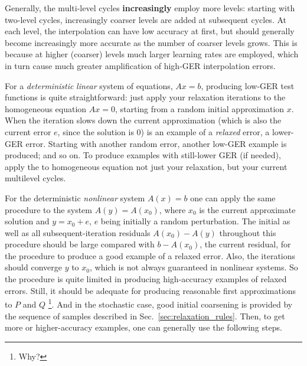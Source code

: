\documentclass{article} %
\begin{document}
Generally, the multi-level cycles \textbf{increasingly} employ more levels: starting with two-level cycles, increasingly coarser levels are added at subsequent cycles. At each level, the interpolation can have low accuracy at first, but should generally become increasingly more accurate as the number of coarser levels grows. This is because at higher (coarser) levels much larger learning rates are employed, which in turn cause much greater amplification of high-GER interpolation errors.

For a {\it deterministic} {\it linear} system of equations, $Ax = b$, producing low-GER test functions is quite straightforward: just apply your relaxation iterations to the homogeneous equation $Ax = 0$, starting from a random initial approximation $x$. When the iteration slows down the current approximation (which is also the current error $e$, since the solution is $0$) is an example of a {\it relaxed} error, a lower-GER error. Starting with another random error, another low-GER example is produced; and so on. To produce examples with still-lower GER (if needed), apply the to homogeneous equation not just your relaxation, but your current multilevel cycles.

For the deterministic {\it nonlinear} system $A(x) = b$ one can apply the same procedure to the system $A(y) = A(x_0)$, where $x_0$ is the current approximate solution and $y = x_0 + e$, $e$ being initially a random perturbation. The initial as well as all subsequent-iteration residuals $A(x_0) - A(y)$  throughout this procedure should be large compared with $b - A(x_0)$, the current residual, for the procedure to produce a good example of a relaxed error. Also, the iterations should converge $y$ to $x_0$, which is not always guaranteed in nonlinear systems. So the procedure is quite limited in producing high-accuracy examples of relaxed errors. Still, it should be adequate for producing reasonable first approximations to $P$ and $Q$ \footnote{Why?}. And in the stochastic case, good initial coarsening is provided by the sequence of samples described in Sec.~\ref{sec:relaxation_rules}. Then, to get more or higher-accuracy examples, one can generally use the following steps.
\end{document}
